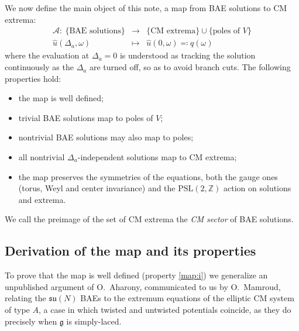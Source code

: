 \documentclass[aps, prx, nofootinbib, twocolumn,amsfonts,amsmath,amssymb,mathtools,superscriptaddress,preprintnumbers,floatfix,reprint]{revtex4-2}
\makeatletter
\newcommand{\alg}{\mathfrak{g}}
\newcommand{\otherlabel}[2]{\protected@edef\@currentlabel{#2}\label{#1}}
\makeatother
\begin{document}
We now define the main object of this note, a map from BAE solutions to CM
extrema:
\begin{equation}\label{eq:Ofer}
  \begin{array}{rcc}
    \mathcal{A}:\ \{\text{BAE solutions}\} & \to &
      \{\text{CM extrema}\}\cup\{\text{poles of }V\}\\[2pt]
    \hat u(\Delta_a,\omega) & \mapsto & \hat u(0,\omega)\eqqcolon q(\omega)
  \end{array}
\end{equation}
where the evaluation at $\Delta_a=0$ is understood as tracking the solution
continuously as the $\Delta_a$ are turned off, so as to avoid branch cuts. The following properties hold:
\begin{itemize}
  \item[\emph{i)}] \otherlabel{map:i}{\emph{i)}} the map is well defined;
  \item[\emph{ii)}] \otherlabel{map:ii}{\emph{ii)}} trivial BAE solutions map to poles of $V$;
  \item[\emph{iii)}] \otherlabel{map:iii}{\emph{iii)}} nontrivial BAE solutions may also map to poles;
  \item[\emph{iv)}] \otherlabel{map:iv}{\emph{iv)}} all nontrivial $\Delta_a$-independent solutions map to CM extrema;
  \item[\emph{v)}] \otherlabel{map:v}{\emph{v)}} the map preserves the symmetries of the equations, both the gauge ones
  (torus, Weyl and center invariance) and the $\mathrm{PSL}(2,\mathbb{Z})$
  action on solutions and extrema.
\end{itemize}
We call the preimage of the set of CM extrema the \emph{CM sector} of BAE
solutions.

\subsection{Derivation of the map and its properties}
\label{sub:derivation}

To prove that the map is well defined (property \ref{map:i}) we generalize an unpublished argument \cite{aharony-mamroud} of
O.~Aharony, communicated to us by O.~Mamroud, relating the $\mathfrak{su}(N)$
BAEs to the extremum equations of the elliptic CM system of type $A$, a case in
which twisted and untwisted potentials coincide, as they do precisely when
$\alg$ is simply-laced.
\end{document}
